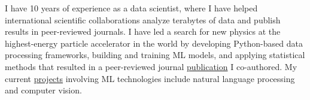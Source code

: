 I have 10 years of experience as a data scientist, where I have helped international scientific collaborations analyze terabytes of data and publish results in peer-reviewed journals. I have led a search for new physics at the highest-energy particle accelerator in the world by developing Python-based data processing frameworks, building and training ML models, and applying statistical methods that resulted in a peer-reviewed journal \href{https://journals.aps.org/prd/pdf/10.1103/PhysRevD.109.112003}{publication} I co-authored. My current \href{https://gmadigan.github.io}{projects} involving ML technologies include natural language processing and computer vision.


